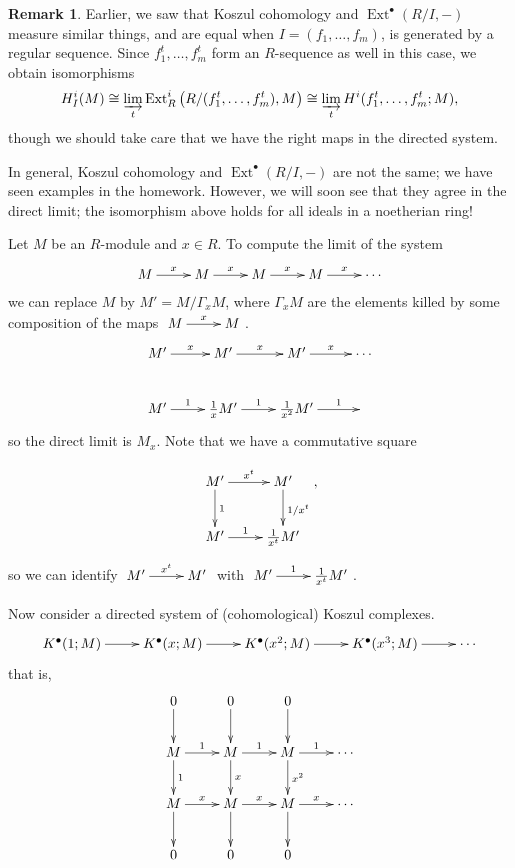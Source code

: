 \documentclass[11pt]{book}
\numberwithin{equation}{section}
\numberwithin{theorem}{chapter}
\theoremstyle{definition}
\newtheorem*{basic properties}{Basic Properties}
\newtheorem*{Important Remark}{Important Remark}
\newtheorem{remark}[theorem]{Remark}
\theoremstyle{remark}
\newcommand{\Ext}{\operatorname{Ext}}
\begin{document}
\begin{remark}
	Earlier, we saw that Koszul cohomology and $\Ext^\bullet(R/I, -)$ measure similar things, and are equal when $I=(f_1,\dots, f_m)$, is generated by a regular sequence. Since $f_1^t,\dots, f_m^t$ form an $R$-sequence as well in this case, we obtain isomorphisms \[H^i_I(M)\cong \varinjlim_t \Ext^i_R \left( R/(f_1^t,\dots, f_m^t), M \right) \cong \varinjlim_t H^i(f_1^t,\dots, f_m^t;M), \]
	though we should take care that we have the right maps in the directed system.
	
	 In general, Koszul cohomology and $\Ext^\bullet(R/I, -)$ are not the same; we have seen examples in the homework. However, we will soon see that they agree in the direct limit; the isomorphism above holds for all ideals in a noetherian ring!
\end{remark}




	Let $M$ be an $R$-module and $x \in R$. To compute the limit of the system
	$$\xymatrix{M \ar[r]^-x & M \ar[r]^-x & M \ar[r]^-x & M \ar[r]^-x & \cdots}$$
	we can replace $M$ by $M' = M/\Gamma_x M$, where $\Gamma_x M$ are the elements killed by some composition of the maps $\xymatrix{M \ar[r]^-x & M}$.
	$$\xymatrix{M' \ar[r]^-x & M' \ar[r]^-x & M' \ar[r]^-x & \cdots \\ M' \ar[r]^-1 & \frac{1}{x} M' \ar[r]^-1 & \frac{1}{x^2} M' \ar[r]^-1 &}$$ 
	so the direct limit is $M_x$. Note that we have a commutative square
	
	\[\xymatrix{ M' \ar[r]^-{x^t}\ar[d]^-{1} & M' \ar[d]^{1/x^t}\\ M' \ar[r]^-{1} & \frac{1}{x^t} M'},\]
	so we can identify $\xymatrix{M' \ar[r]^-{x^t} & M'}$ with $\xymatrix{M' \ar[r]^-{1} & \frac{1}{x^t} M'}$.
	
	Now consider a directed system of (cohomological) Koszul complexes.
	$$\xymatrix{K^\bullet(1;M) \ar[r] & K^\bullet(x;M) \ar[r] & K^\bullet(x^2;M) \ar[r] & K^\bullet(x^3;M) \ar[r] & \cdots}$$
	that is,
	$$\xymatrix{0 \ar[d] & 0 \ar[d] & 0 \ar[d] & \\
	M \ar[r]^-1 \ar[d]^-1 & M \ar[r]^-1 \ar[d]^-{x} & M \ar[r]^-1 \ar[d]^-{x^2} & \cdots \\
	M \ar[r]^-x \ar[d] & M \ar[r]^-x \ar[d] & M \ar[r]^-x \ar[d] & \cdots \\
	0 & 0 & 0}$$ 
\end{document}
